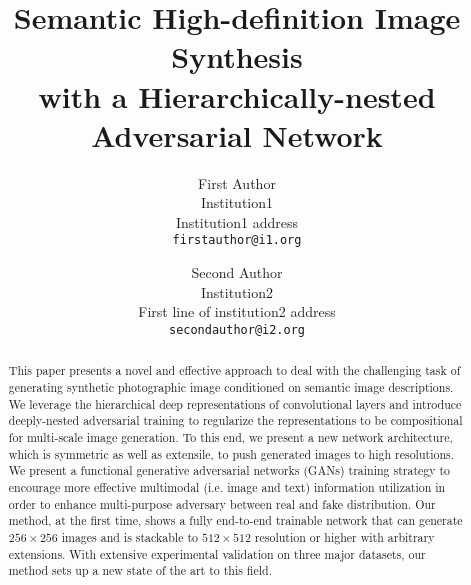 \documentclass[10pt,twocolumn,letterpaper]{article}
\begin{document}
\title{Semantic High-definition Image Synthesis \\ with a Hierarchically-nested Adversarial Network}

\author{First Author\\
Institution1\\
Institution1 address\\
{\tt\small firstauthor@i1.org}
\and
Second Author\\
Institution2\\
First line of institution2 address\\
{\tt\small secondauthor@i2.org}
}

\maketitle

\begin{abstract}
This paper presents a novel  and effective approach to deal with the challenging task of generating synthetic photographic image conditioned on semantic image descriptions. We leverage the hierarchical deep representations of convolutional layers and introduce deeply-nested adversarial training to regularize the representations to be compositional for multi-scale image generation. To this end, we present a new network architecture, which is symmetric as well as extensile, to push generated images to high resolutions.  We present a functional generative adversarial networks (GANs) training strategy to encourage more effective multimodal (i.e. image and text) information utilization in order to enhance multi-purpose adversary between real and fake distribution. Our method, at the first time, shows a fully end-to-end trainable network that can generate $256{\times}256$ images and is stackable to $512{\times}512$ resolution or higher with arbitrary extensions. With extensive experimental validation on three major datasets, our method sets up a new state of the art to this field. 

\end{abstract}


\end{document}
